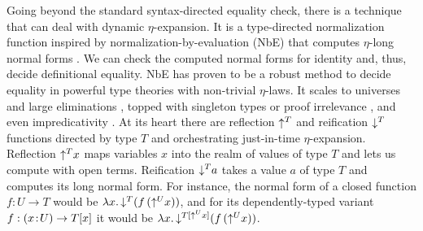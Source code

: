 \documentclass[acmsmall,screen]{acmart}\settopmatter{}
\begin{document}
Going beyond the standard syntax-directed equality check, there is a
technique that can deal with dynamic $\eta$-expansion.  It is a
type-directed normalization function inspired by
normalization-by-evaluation (NbE) that computes $\eta$-long normal
forms \cite{bergerSchwichtenberg:lics91,danvy:tdpe}.  We can check the
computed normal forms for identity and, thus, decide definitional
equality.  NbE has proven to be a robust method to decide equality in
powerful type theories with non-trivial $\eta$-laws.  It scales to
universes and large eliminations \cite{abelCoquandDybjer:lics07},
topped with singleton types or proof irrelevance
\cite{abelCoquandPagano:lmcs11}, and even impredicativity
\cite{abel:flops10}.  At its heart there are reflection $\mathord{\uparrow^{T}}$ and
reification $\mathord{\downarrow^{T}}$ functions directed by type $T$ and orchestrating
just-in-time $\eta$-expansion.  Reflection $\mathord{\uparrow^{T}} x$ maps variables
$x$ into the realm of values of type $T$ and lets us compute with
open terms.  Reification $\mathord{\downarrow^{T}} a$ takes a value $a$ of type $T$ and
computes its long normal form.  For instance, the normal form of a
closed function $f : U \to T$ would be
$\lambda x.\,\mathord{\downarrow^{T}} (f\,(\mathord{\uparrow^{U}} x))$, and for its dependently-typed
variant $f : (x \!:\! U) \to T[x]$ it would be
$\lambda x.\,\mathord{\downarrow^{T[\mathord{\uparrow^{U}} x]}} (f\,(\mathord{\uparrow^{U}} x))$.

\end{document}
